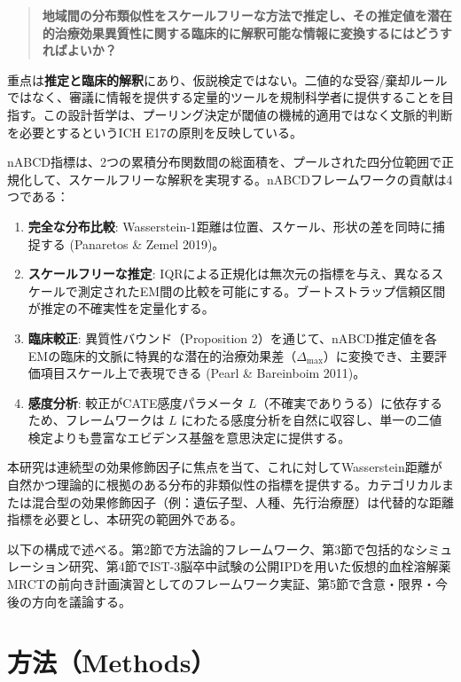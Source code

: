 \documentclass[
  a4paper,
  11pt]{ltjsarticle}
\providecommand{\tightlist}{%
  \setlength{\itemsep}{0pt}\setlength{\parskip}{0pt}}\usepackage{longtable,booktabs,array}
\begin{document}
\begin{quote}
\textbf{地域間の分布類似性をスケールフリーな方法で推定し、その推定値を潜在的治療効果異質性に関する臨床的に解釈可能な情報に変換するにはどうすればよいか？}
\end{quote}

重点は\textbf{推定と臨床的解釈}にあり、仮説検定ではない。二値的な受容/棄却ルールではなく、審議に情報を提供する定量的ツールを規制科学者に提供することを目指す。この設計哲学は、プーリング決定が閾値の機械的適用ではなく文脈的判断を必要とするというICH
E17の原則を反映している。

nABCD指標は、2つの累積分布関数間の総面積を、プールされた四分位範囲で正規化して、スケールフリーな解釈を実現する。nABCDフレームワークの貢献は4つである：

\begin{enumerate}
\def\labelenumi{\arabic{enumi}.}
\tightlist
\item
  \textbf{完全な分布比較}:
  Wasserstein-1距離は位置、スケール、形状の差を同時に捕捉する (Panaretos
  \& Zemel 2019)。
\item
  \textbf{スケールフリーな推定}:
  IQRによる正規化は無次元の指標を与え、異なるスケールで測定されたEM間の比較を可能にする。ブートストラップ信頼区間が推定の不確実性を定量化する。
\item
  \textbf{臨床較正}: 異質性バウンド（Proposition
  2）を通じて、nABCD推定値を各EMの臨床的文脈に特異的な潜在的治療効果差（\(\Delta_{\max}\)）に変換でき、主要評価項目スケール上で表現できる
  (Pearl \& Bareinboim 2011)。
\item
  \textbf{感度分析}: 較正がCATE感度パラメータ
  \(L\)（不確実でありうる）に依存するため、フレームワークは \(L\)
  にわたる感度分析を自然に収容し、単一の二値検定よりも豊富なエビデンス基盤を意思決定に提供する。
\end{enumerate}

本研究は連続型の効果修飾因子に焦点を当て、これに対してWasserstein距離が自然かつ理論的に根拠のある分布的非類似性の指標を提供する。カテゴリカルまたは混合型の効果修飾因子（例：遺伝子型、人種、先行治療歴）は代替的な距離指標を必要とし、本研究の範囲外である。

以下の構成で述べる。第2節で方法論的フレームワーク、第3節で包括的なシミュレーション研究、第4節でIST-3脳卒中試験の公開IPDを用いた仮想的血栓溶解薬MRCTの前向き計画演習としてのフレームワーク実証、第5節で含意・限界・今後の方向を議論する。

\section{方法（Methods）}\label{ux65b9ux6cd5methods}
\end{document}
